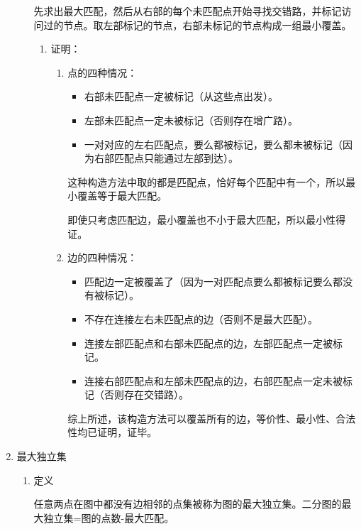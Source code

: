 \documentclass[11pt]{article}
\begin{document}
\begin{enumerate}
\begin{enumerate}
先求出最大匹配，然后从右部的每个未匹配点开始寻找交错路，并标记访问过的节点。取左部标记的节点，右部未标记的节点构成一组最小覆盖。

\begin{enumerate}
\item 证明：
\label{sec-2-4-4-2-2-1}

\begin{enumerate}
\item 点的四种情况：
\label{sec-2-4-4-2-2-1-1}

\begin{itemize}
\item 右部未匹配点一定被标记（从这些点出发）。
\item 左部未匹配点一定未被标记（否则存在增广路）。
\item 一对对应的左右匹配点，要么都被标记，要么都未被标记（因为右部匹配点只能通过左部到达）。
\end{itemize}

这种构造方法中取的都是匹配点，恰好每个匹配中有一个，所以最小覆盖等于最大匹配。

即使只考虑匹配边，最小覆盖也不小于最大匹配，所以最小性得证。

\item 边的四种情况：
\label{sec-2-4-4-2-2-1-2}

\begin{itemize}
\item 匹配边一定被覆盖了（因为一对匹配点要么都被标记要么都没有被标记）。
\item 不存在连接左右未匹配点的边（否则不是最大匹配）。
\item 连接左部匹配点和右部未匹配点的边，左部匹配点一定被标记。
\item 连接右部匹配点和左部未匹配点的边，右部匹配点一定未被标记（否则存在交错路）。
\end{itemize}

综上所述，该构造方法可以覆盖所有的边，等价性、最小性、合法性均已证明，证毕。
\end{enumerate}
\end{enumerate}
\end{enumerate}

\item 最大独立集
\label{sec-2-4-4-3}

\begin{enumerate}
\item 定义
\label{sec-2-4-4-3-1}

任意两点在图中都没有边相邻的点集被称为图的最大独立集。二分图的最大独立集=图的点数-最大匹配。


\end{enumerate}
\end{enumerate}
\end{document}
